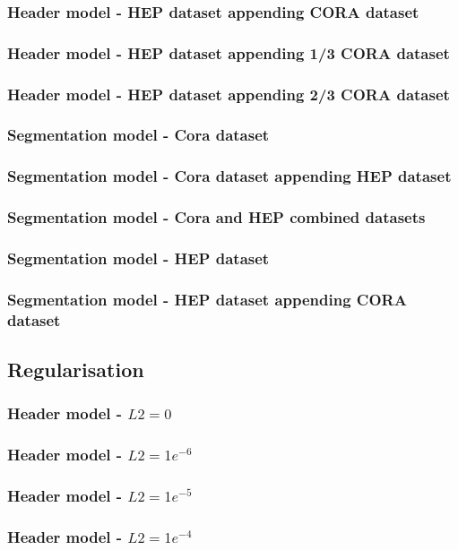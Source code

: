 \documentclass[10pt, oneside]{scrartcl}   	%
\begin{document}
\subsubsection{Header model - HEP dataset appending CORA dataset}
\subsubsection{Header model - HEP dataset appending 1/3 CORA dataset}
\subsubsection{Header model - HEP dataset appending 2/3 CORA dataset}
\subsubsection{Segmentation model - Cora dataset}
\subsubsection{Segmentation model - Cora dataset appending HEP dataset}
\subsubsection{Segmentation model - Cora and HEP combined datasets}
\subsubsection{Segmentation model - HEP dataset}
\subsubsection{Segmentation model - HEP dataset appending CORA dataset}
\subsection{Regularisation}
\subsubsection{Header model - $L2 = 0$}
\subsubsection{Header model - $L2 = 1e^{-6}$}
\subsubsection{Header model - $L2 = 1e^{-5}$}
\subsubsection{Header model - $L2 = 1e^{-4}$}
\end{document}
